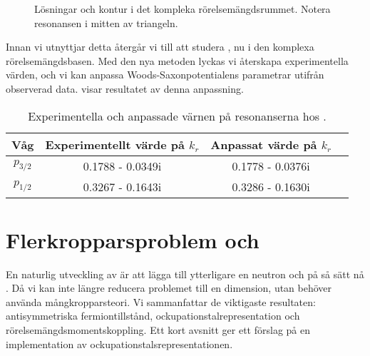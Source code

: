 \documentclass[12pt,a4paper]{article}
\begin{document}
\begin{figure}
   \caption{Lösningar och kontur i det kompleka rörelsemängdsrummet. Notera resonansen i mitten av triangeln.} 
\label{fig:berggren_contour}  
\end{figure}

Innan vi utnyttjar detta återgår vi till att studera , nu i den komplexa rörelsemängdsbasen. Med den nya metoden lyckas vi återskapa experimentella värden, och vi kan anpassa Woods-Saxonpotentialens parametrar utifrån observerad data.  visar resultatet av denna anpassning.

\begin{table}[b]
\caption{Experimentella och anpassade värnen på resonanserna hos .}
\begin{center}
  \label{tab:resonances}
   \begin{tabular}{c|c|c|c}
    Våg      & Experimentellt värde på $k_r$ & Anpassat värde på $k_r$  \\
    \hline
    $p_{3/2}$ & 0.1788 -  0.0349i & 0.1778 - 0.0376i \\
    $p_{1/2}$ & 0.3267 - 0.1643i & 0.3286 - 0.1630i \\
  \end{tabular}
  \end{center}
\end{table}

\section{Flerkropparsproblem och }
En naturlig utveckling av  är att lägga till ytterligare en neutron och på så sätt nå . 
Då vi kan inte längre reducera problemet till en dimension, utan behöver använda mångkropparsteori.
Vi sammanfattar de viktigaste resultaten: antisymmetriska fermiontillstånd, ockupationstalrepresentation och rörelsemängdsmomentskoppling.
Ett kort avsnitt ger ett förslag på en implementation av ockupationstalsrepresentationen.
\end{document}
